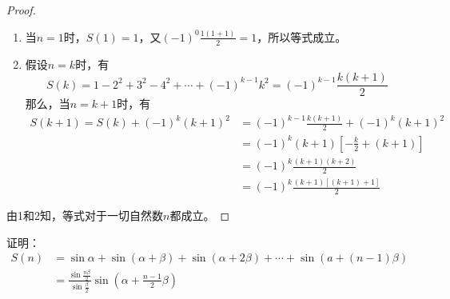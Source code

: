 \begin{proof}
\begin{enumerate}
    \item 当$n=1$时，$S(1)=1$，又$(-1)^0\frac{1(1+1)}{2}=1$，所以等式成立。

\item 假设$n=k$时，有
\[S(k)=1-2^2+3^2-4^2+\cdots+(-1)^{k-1}k^2=(-1)^{k-1}\frac{k(k+1)}{2}\]
那么，当$n=k+1$时，有    
\[\begin{split}
    S(k+1)=S(k)+(-1)^k(k+1)^2&=(-1)^{k-1}\frac{k(k+1)}{2}+(-1)^k(k+1)^2\\
    &=(-1)^k(k+1)\left[-\frac{k}{2}+(k+1)\right]\\
    &=(-1)^k \frac{(k+1)(k+2)}{2}\\
    &=(-1)^k \frac{(k+1)[(k+1)+1]}{2}
\end{split}\]
\end{enumerate}

由1和2知，等式对于一切自然数$n$都成立。
\end{proof}


\begin{example}
证明：
\[\begin{split}
    S(n)&= \sin \alpha+\sin (\alpha+\beta)+\sin (\alpha+2 \beta)+\cdots+\sin (a+(n-1) \beta) \\
&= \frac{\sin \frac{n \beta}{2}}{\sin \frac{\beta}{2}} \sin \left(\alpha+\frac{n-1}{2} \beta\right)
\end{split}\]
\end{example}

